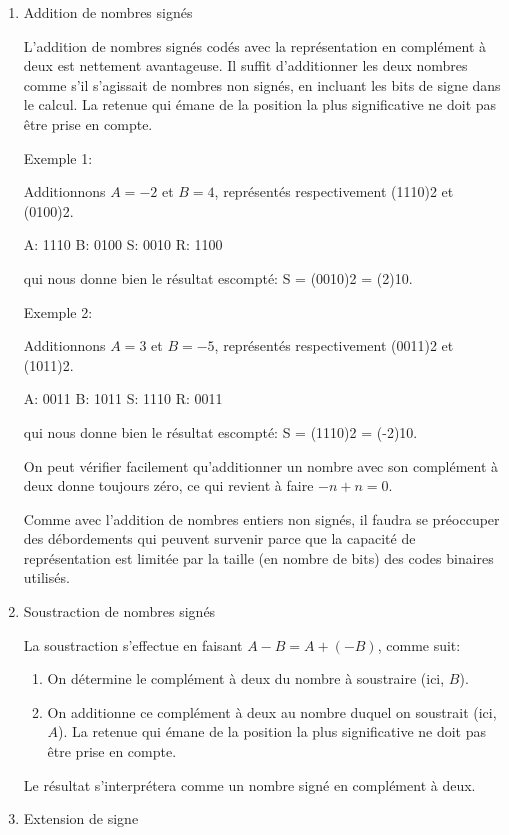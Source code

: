 \documentclass[letter, oneside]{book}
\begin{document}
\begin{enumerate}
\item Addition de nombres signés
\label{sec:orga4ca5c5}

L'addition de nombres signés codés avec la représentation en complément
à deux est nettement avantageuse. Il suffit d'additionner les deux
nombres comme s'il s'agissait de nombres non signés, en incluant les
bits de signe dans le calcul. La retenue qui émane de la position la
plus significative ne doit pas être prise en compte. 

Exemple 1:

Additionnons \(A=-2\) et \(B=4\), représentés respectivement (1110)2 et (0100)2.

A: 1110
B: 0100
S: 0010
R: 1100

qui nous donne bien le résultat escompté: S = (0010)2 = (2)10.

Exemple 2:

Additionnons \(A=3\) et \(B=-5\), représentés respectivement (0011)2 et (1011)2.

A: 0011
B: 1011
S: 1110
R: 0011

qui nous donne bien le résultat escompté: S = (1110)2 = (-2)10.

On peut vérifier facilement qu'additionner un nombre avec son
complément à deux donne toujours zéro, ce qui revient à faire \(-n + n
= 0\).

Comme avec l'addition de nombres entiers non signés, il faudra se
préoccuper des débordements qui peuvent survenir parce que la capacité
de représentation est limitée par la taille (en nombre de bits) des
codes binaires utilisés.

\item Soustraction de nombres signés
\label{sec:orgd13a3b8}

La soustraction s'effectue en faisant \(A - B = A + (-B)\), comme suit:

\begin{enumerate}
\item On détermine le complément à deux du nombre à soustraire (ici, \(B\)).
\item On additionne ce complément à deux au nombre duquel on soustrait  (ici, \(A\)). La
retenue qui émane de la position la plus significative ne doit pas
être prise en compte.
\end{enumerate}

Le résultat s'interprétera comme un nombre signé en complément à deux. 

\item Extension de signe
\label{sec:org871980f}


\end{enumerate}
\end{document}
